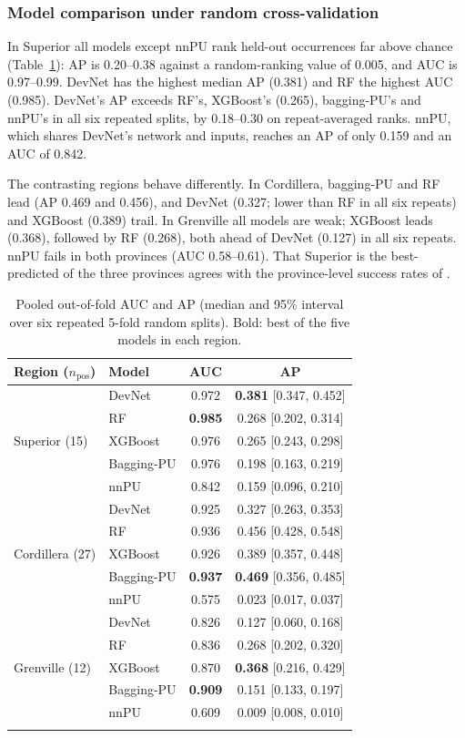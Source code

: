 \documentclass[pdflatex,sn-apa]{sn-jnl}
\begin{document}
\subsubsection{Model comparison under random cross-validation}\label{sec:res-random}

In Superior all models except nnPU rank held-out occurrences far above chance (Table~\ref{tab:benchmark}): AP is 0.20--0.38 against a random-ranking value of 0.005, and AUC is 0.97--0.99. DevNet has the highest median AP (0.381) and RF the highest AUC (0.985). DevNet's AP exceeds RF's, XGBoost's (0.265), bagging-PU's and nnPU's in all six repeated splits, by 0.18--0.30 on repeat-averaged ranks. nnPU, which shares DevNet's network and inputs, reaches an AP of only 0.159 and an AUC of 0.842.

The contrasting regions behave differently. In Cordillera, bagging-PU and RF lead (AP 0.469 and 0.456), and DevNet (0.327; lower than RF in all six repeats) and XGBoost (0.389) trail. In Grenville all models are weak; XGBoost leads (0.368), followed by RF (0.268), both ahead of DevNet (0.127) in all six repeats. nnPU fails in both provinces (AUC 0.58--0.61). That Superior is the best-predicted of the three provinces agrees with the province-level success rates of \citet{Parsa2024}.

\begin{table}[t]
\caption{Pooled out-of-fold AUC and AP (median and 95\% interval over six repeated 5-fold random splits). Bold: best of the five models in each region.}\label{tab:benchmark}
\footnotesize
\begin{tabular*}{\textwidth}{@{\extracolsep\fill}llcc}
\toprule
Region ($n_{\mathrm{pos}}$) & Model & AUC & AP \\
\midrule
\multirow{5}{*}{Superior (15)} & DevNet & 0.972 & \textbf{0.381} [0.347, 0.452] \\
 & RF & \textbf{0.985} & 0.268 [0.202, 0.314] \\
 & XGBoost & 0.976 & 0.265 [0.243, 0.298] \\
 & Bagging-PU & 0.976 & 0.198 [0.163, 0.219] \\
 & nnPU & 0.842 & 0.159 [0.096, 0.210] \\
\midrule
\multirow{5}{*}{Cordillera (27)} & DevNet & 0.925 & 0.327 [0.263, 0.353] \\
 & RF & 0.936 & 0.456 [0.428, 0.548] \\
 & XGBoost & 0.926 & 0.389 [0.357, 0.448] \\
 & Bagging-PU & \textbf{0.937} & \textbf{0.469} [0.356, 0.485] \\
 & nnPU & 0.575 & 0.023 [0.017, 0.037] \\
\midrule
\multirow{5}{*}{Grenville (12)} & DevNet & 0.826 & 0.127 [0.060, 0.168] \\
 & RF & 0.836 & 0.268 [0.202, 0.320] \\
 & XGBoost & 0.870 & \textbf{0.368} [0.216, 0.429] \\
 & Bagging-PU & \textbf{0.909} & 0.151 [0.133, 0.197] \\
 & nnPU & 0.609 & 0.009 [0.008, 0.010] \\
\botrule
\end{tabular*}
\end{table}
\end{document}
